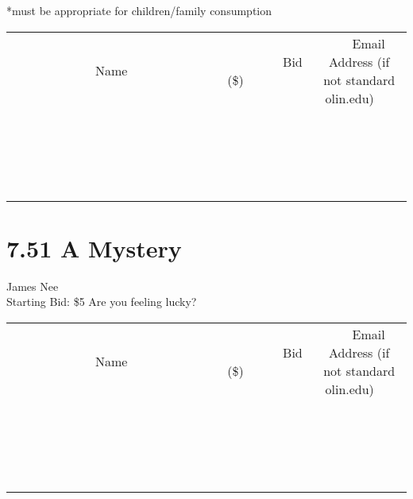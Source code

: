 \documentclass[11pt]{article}
\begin{document}
*must be appropriate for children/family consumption
\\[3ex]
\begin{tabular}{c c c}
~~~~~~~~~~~~~Name~~~~~~~~~~~~~ & ~~~~~~~~~Bid (\$)~~~~~~~~~  & ~~~Email Address (if not standard olin.edu)~~~\\
 & & \\
\hline
 & & \\
\hline
 & & \\
\hline
 & & \\
\hline
 & & \\
\hline
 & & \\
\hline
 & & \\
\hline
 & & \\
\hline
 & & \\
\hline
 & & \\
\hline
 & & \\
\hline
 & & \\
\hline
 & & \\
\hline
 & & \\
\hline
 & & \\
\hline
 & & \\
\hline
 & & \\
\hline
 & & \\
\hline
 & & \\
\hline
\end{tabular}
\newpage
\section*{7.51 A Mystery}
James Nee
\\
Starting Bid: \$5
\newline
Are you feeling lucky?
\\[3ex]
\begin{tabular}{c c c}
~~~~~~~~~~~~~Name~~~~~~~~~~~~~ & ~~~~~~~~~Bid (\$)~~~~~~~~~  & ~~~Email Address (if not standard olin.edu)~~~\\
 & & \\
\hline
 & & \\
\hline
 & & \\
\hline
 & & \\
\hline
 & & \\
\hline
 & & \\
\hline
 & & \\
\hline
 & & \\
\hline
 & & \\
\hline
 & & \\
\hline
 & & \\
\hline
 & & \\
\hline
 & & \\
\hline
 & & \\
\hline
 & & \\
\hline
 & & \\
\hline
 & & \\
\hline
 & & \\
\hline
 & & \\
\hline
\end{tabular}
\newpage
\end{document}
